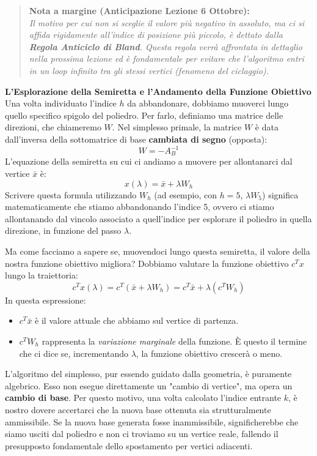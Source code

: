 \documentclass[12pt, a4paper]{article}
\begin{document}
	\begin{quote}
		\textbf{Nota a margine (Anticipazione Lezione 6 Ottobre):} \\
		\textit{Il motivo per cui non si sceglie il valore più negativo in assoluto, ma ci si affida rigidamente all'indice di posizione più piccolo, è dettato dalla \textbf{Regola Anticiclo di Bland}. Questa regola verrà affrontata in dettaglio nella prossima lezione ed è fondamentale per evitare che l'algoritmo entri in un loop infinito tra gli stessi vertici (fenomeno del ciclaggio).}
	\end{quote}
	
	\vspace{0.4cm}
	\textbf{L'Esplorazione della Semiretta e l'Andamento della Funzione Obiettivo}\\
	Una volta individuato l'indice $h$ da abbandonare, dobbiamo muoverci lungo quello specifico spigolo del poliedro. Per farlo, definiamo una matrice delle direzioni, che chiameremo $W$. 
	Nel simplesso primale, la matrice $W$ è data dall'inversa della sottomatrice di base \textbf{cambiata di segno} (opposta):
	\[
	W = -A_B^{-1}
	\]
	L'equazione della semiretta su cui ci andiamo a muovere per allontanarci dal vertice $\bar{x}$ è:
	\[
	x(\lambda) = \bar{x} + \lambda W_h
	\]
	Scrivere questa formula utilizzando $W_h$ (ad esempio, con $h=5$, $\lambda W_5$) significa matematicamente che stiamo abbandonando l'indice 5, ovvero ci stiamo allontanando dal vincolo associato a quell'indice per esplorare il poliedro in quella direzione, in funzione del passo $\lambda$.
	
	Ma come facciamo a sapere se, muovendoci lungo questa semiretta, il valore della nostra funzione obiettivo migliora? Dobbiamo valutare la funzione obiettivo $c^T x$ lungo la traiettoria:
	\[
	c^T x(\lambda) = c^T (\bar{x} + \lambda W_h) = c^T \bar{x} + \lambda (c^T W_h)
	\]
	In questa espressione:
	\begin{itemize}[label=$\circ$, itemsep=2pt, leftmargin=1.5cm]
		\item $c^T \bar{x}$ è il valore attuale che abbiamo sul vertice di partenza.
		\item $c^T W_h$ rappresenta la \textit{variazione marginale} della funzione. È questo il termine che ci dice se, incrementando $\lambda$, la funzione obiettivo crescerà o meno.
	\end{itemize}
	
	L'algoritmo del simplesso, pur essendo guidato dalla geometria, è puramente algebrico. Esso non esegue direttamente un "cambio di vertice", ma opera un \textbf{cambio di base}. Per questo motivo, una volta calcolato l'indice entrante $k$, è nostro dovere accertarci che la nuova base ottenuta sia strutturalmente ammissibile. Se la nuova base generata fosse inammissibile, significherebbe che siamo usciti dal poliedro e non ci troviamo su un vertice reale, fallendo il presupposto fondamentale dello spostamento per vertici adiacenti.
	
\end{document}
